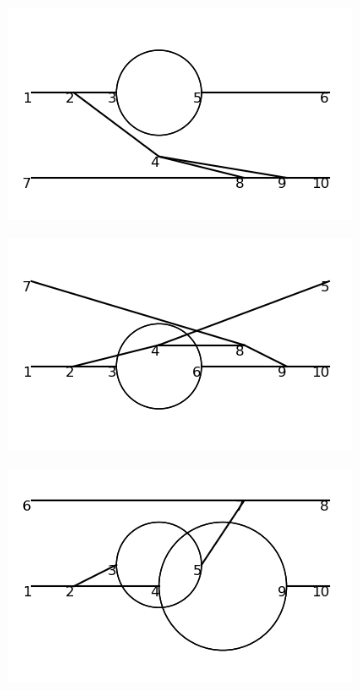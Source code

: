 \documentclass[11pt,a4paper,twoside,pdf]{article}
\numberwithin{equation}{section}
\begin{document}
\begin{figure}[h!]
\begin{subfigure}[t]{0.16\textwidth}
    \end{subfigure}
    \hfill
    \begin{subfigure}[t]{0.16\textwidth}
        \centering
        \includegraphics[width=\textwidth]{plots/order6_2to2/24.png}
    \end{subfigure}
    \hfill
    \begin{subfigure}[t]{0.16\textwidth}
        \centering
        \includegraphics[width=\textwidth]{plots/order6_2to2/25.png}
    \end{subfigure}
    \hfill
    \begin{subfigure}[t]{0.16\textwidth}
        \centering
        \includegraphics[width=\textwidth]{plots/order6_2to2/26.png}

\end{subfigure}
\end{figure}
\end{document}
